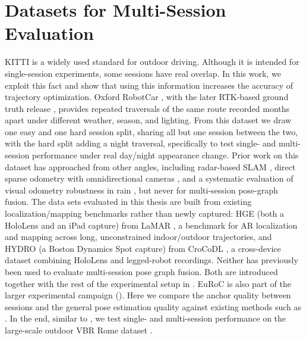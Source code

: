 \section{Datasets for Multi-Session Evaluation}

KITTI \cite{geiger2012kitti} is a widely used standard for outdoor driving. Although it is intended for single-session experiments, some sessions have real overlap. In this work, we exploit this fact and show that using this information increases the accuracy of trajectory optimization. Oxford RobotCar \cite{maddern2017robotcar}, with the later RTK-based ground truth release \cite{maddern2020rtk}, provides repeated traversals of the same route recorded months apart under different weather, season, and lighting. From this dataset we draw one easy and one hard session split, sharing all but one session between the two, with the hard split adding a night traversal, specifically to test single- and multi-session performance under real day/night appearance change. Prior work on this dataset has approached from other angles, including radar-based SLAM \cite{radarslam2021}, direct sparse odometry with omnidirectional cameras \cite{matsuki2018omnidso}, and a systematic evaluation of visual odometry robustness in rain \cite{tan2023voautorain}, but never for multi-session pose-graph fusion. The data sets evaluated in this thesis are built from existing localization/mapping benchmarks rather than newly captured: HGE (both a HoloLens and an iPad capture) from LaMAR \cite{sarlin2022lamar}, a benchmark for AR localization and mapping across long, unconstrained indoor/outdoor trajectories, and HYDRO (a Boston Dynamics Spot capture) from CroCoDL \cite{blum2025crocodl}, a cross-device dataset combining HoloLens and legged-robot recordings. Neither has previously been used to evaluate multi-session pose graph fusion. Both are introduced together with the rest of the experimental setup in . EuRoC \cite{burri2016euroc} is also part of the larger experimental campaign (). Here we compare the anchor quality between sessions and the general pose estimation quality against existing methods such as \cite{elvira2019orbslamatlasrobustaccuratemultimap, covins, covins-g}. In the end, similar to \cite{lim2025twogo}, we test single- and multi-session performance on the large-scale outdoor VBR Rome dataset \cite{vbr}.